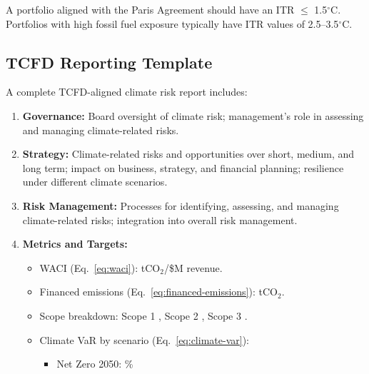 \documentclass[11pt, a4paper]{article}
\theoremstyle{definition}
\theoremstyle{plain}
\theoremstyle{remark}
\begin{document}
A portfolio aligned with the Paris Agreement should have an ITR $\leq$ 1.5$^\circ$C.
Portfolios with high fossil fuel exposure typically have ITR values of
2.5--3.5$^\circ$C.

\subsection{TCFD Reporting Template}

A complete TCFD-aligned climate risk report includes:

\begin{algorithmbox}[title={TCFD Disclosure Template}]
\label{alg:tcfd-template}
\begin{enumerate}
    \item \textbf{Governance:} Board oversight of climate risk; management's
          role in assessing and managing climate-related risks.
    \item \textbf{Strategy:} Climate-related risks and opportunities over
          short, medium, and long term; impact on business, strategy, and
          financial planning; resilience under different climate scenarios.
    \item \textbf{Risk Management:} Processes for identifying, assessing, and
          managing climate-related risks; integration into overall risk management.
    \item \textbf{Metrics and Targets:}
          \begin{itemize}
              \item WACI (Eq.~\ref{eq:waci}): \underline{\hspace{2cm}}
                    tCO$_2$/\$M revenue.
              \item Financed emissions (Eq.~\ref{eq:financed-emissions}):
                    \underline{\hspace{2cm}} tCO$_2$.
              \item Scope breakdown: Scope 1 \underline{\hspace{1cm}},
                    Scope 2 \underline{\hspace{1cm}},
                    Scope 3 \underline{\hspace{1cm}}.
              \item Climate VaR by scenario (Eq.~\ref{eq:climate-var}):
                    \begin{itemize}
                        \item Net Zero 2050: \underline{\hspace{1.5cm}}\%

\end{itemize}
\end{itemize}
\end{enumerate}
\end{algorithmbox}
\end{document}

